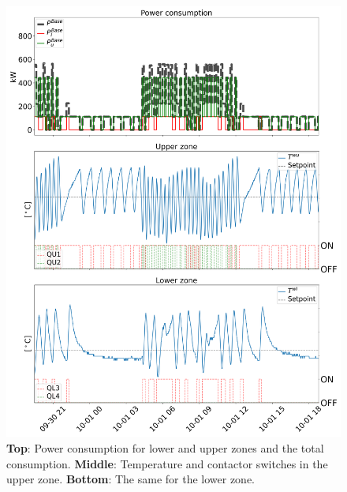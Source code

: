\documentclass[conference]{IEEEtran}
\begin{document}
\begin{figure}[t]
    \centering
    \includegraphics[width=\columnwidth]{../figures/data_visualization.png}
    \caption{\small{\textbf{Top}: Power consumption for lower and upper zones and the total consumption. \textbf{Middle}: Temperature and contactor switches in the upper zone. \textbf{Bottom}: The same for the lower zone.
                \vspace{-2mm}}}
    \label{fig:data_visualization}
\end{figure}

\vspace{2mm}
\end{document}
